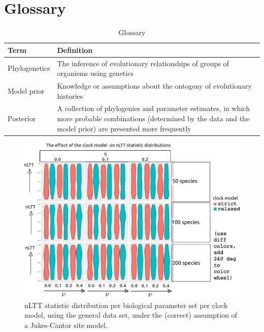 \documentclass{article}
\begin{document}
\section{Glossary}
\begin{table}
  \centering 
  \begin{tabular}{l p{}}
    \hline
    Term                  & Definition \\
    \hline
    \hline
    Phylogenetics         & The inference of evolutionary relationships of groups of organisms using genetics \\
    Model prior           & Knowledge or assumptions about the ontogeny of evolutionary histories \\
    Posterior             & A collection of phylogenies and parameter estimates, in which more probable combinations (determined by the data and the model prior) are presented more frequently \\
    \hline
  \end{tabular}
  \caption{
    Glossary
  }
  \label{table:glossary}
\end{table}




\appendix

\begin{figure}[!htbp]
  \includegraphics[width=\textwidth]{fig_clock_model.png}
  \caption{
    nLTT statistic distribution per biological parameter set per clock model,
    using the general data set, 
    under the (correct) assumption of a Jukes-Cantor site model.
  }
\end{figure}
\end{document}

